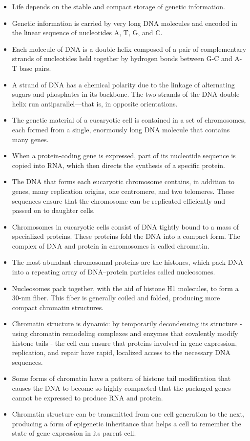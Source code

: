\begin{itemize}
\item Life depends on the stable and compact storage of genetic
information.
\item Genetic information is carried by very long DNA molecules and
encoded in the linear sequence of nucleotides A, T, G, and C.
\item Each molecule of DNA is a double helix composed of a pair of complementary
strands of nucleotides held together by hydrogen bonds
between G-C and A-T base pairs.
\item A strand of DNA has a chemical polarity due to the linkage of alternating
sugars and phosphates in its backbone. The two strands of the
DNA double helix run antiparallel—that is, in opposite orientations.
\item The genetic material of a eucaryotic cell is contained in a set of chromosomes,
each formed from a single, enormously long DNA molecule
that contains many genes.
\item When a protein-coding gene is expressed, part of its nucleotide
sequence is copied into RNA, which then directs the synthesis of a
specific protein.
\item The DNA that forms each eucaryotic chromosome contains, in addition
to genes, many replication origins, one centromere, and two
telomeres. These sequences ensure that the chromosome can be replicated
efficiently and passed on to daughter cells.
\item Chromosomes in eucaryotic cells consist of DNA tightly bound to a
mass of specialized proteins. These proteins fold the DNA into a compact form.
The complex of DNA and protein in chromosomes is called chromatin.
\item The most abundant chromosomal proteins are the histones, which
pack DNA into a repeating array of DNA–protein particles called
nucleosomes.
\item Nucleosomes pack together, with the aid of histone H1 molecules, to
form a 30-nm fiber. This fiber is generally coiled and folded, producing
more compact chromatin structures.
\item Chromatin structure is dynamic: by temporarily decondensing its
structure - using chromatin remodeling complexes and enzymes that
covalently modify histone tails - the cell can ensure that proteins
involved in gene expression, replication, and repair have rapid, localized
access to the necessary DNA sequences.
\item Some forms of chromatin have a pattern of histone tail modification
that causes the DNA to become so highly compacted that the packaged
genes cannot be expressed to produce RNA and protein.
\item Chromatin structure can be transmitted from one cell generation to
the next, producing a form of epigenetic inheritance that helps a cell
to remember the state of gene expression in its parent cell.
\end{itemize}

